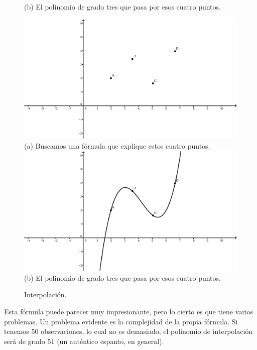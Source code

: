 \begin{figure}[htbp]
\begin{center}
\begin{enColor}
(b) El polinomio de grado tres que pasa por esos cuatro puntos.
\end{enColor}
\begin{bn}
\includegraphics[width=12cm]{../fig/Cap10-Interpolacion01-bn.png}\\
(a) Buscamos una f\'ormula que explique estos cuatro puntos.\\[3mm]
\includegraphics[width=12cm]{../fig/Cap10-Interpolacion02-bn.png}\\
(b) El polinomio de grado tres que pasa por esos cuatro puntos.
\end{bn}
\caption{Interpolación.}
\label{cap10:fig:Interpolacion01}
\end{center}
\end{figure}

Esta fórmula puede parecer muy impresionante, pero lo cierto es que tiene varios problemas. Un problema evidente es la complejidad de la propia fórmula. Si tenemos $50$ observaciones, lo cual no es demasiado, el polinomio de interpolación será de grado $51$ (un auténtico espanto, en general).

